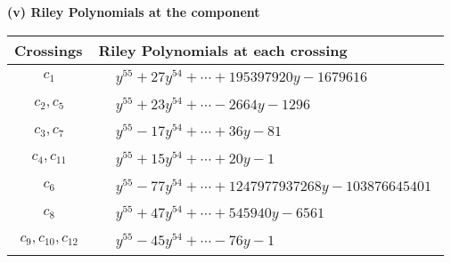 \documentclass[1p]{elsarticle_modified}
\theoremstyle{definition}
\begin{document}
\flushleft \textbf{(v) Riley Polynomials at the component}\newline \\
\begin{tabular}{m{50pt}|m{274pt}}
Crossings & \hspace{64pt}Riley Polynomials at each crossing \\
\hline $$\begin{aligned}c_{1}\end{aligned}$$&$\begin{aligned}
&y^{55}+27 y^{54}+\cdots+195397920 y-1679616
\end{aligned}$\\
\hline $$\begin{aligned}c_{2},c_{5}\end{aligned}$$&$\begin{aligned}
&y^{55}+23 y^{54}+\cdots-2664 y-1296
\end{aligned}$\\
\hline $$\begin{aligned}c_{3},c_{7}\end{aligned}$$&$\begin{aligned}
&y^{55}-17 y^{54}+\cdots+36 y-81
\end{aligned}$\\
\hline $$\begin{aligned}c_{4},c_{11}\end{aligned}$$&$\begin{aligned}
&y^{55}+15 y^{54}+\cdots+20 y-1
\end{aligned}$\\
\hline $$\begin{aligned}c_{6}\end{aligned}$$&$\begin{aligned}
&y^{55}-77 y^{54}+\cdots+1247977937268 y-103876645401
\end{aligned}$\\
\hline $$\begin{aligned}c_{8}\end{aligned}$$&$\begin{aligned}
&y^{55}+47 y^{54}+\cdots+545940 y-6561
\end{aligned}$\\
\hline $$\begin{aligned}c_{9},c_{10},c_{12}\end{aligned}$$&$\begin{aligned}
&y^{55}-45 y^{54}+\cdots-76 y-1
\end{aligned}$\\
\hline
\end{tabular}\\~\\
\end{document}
